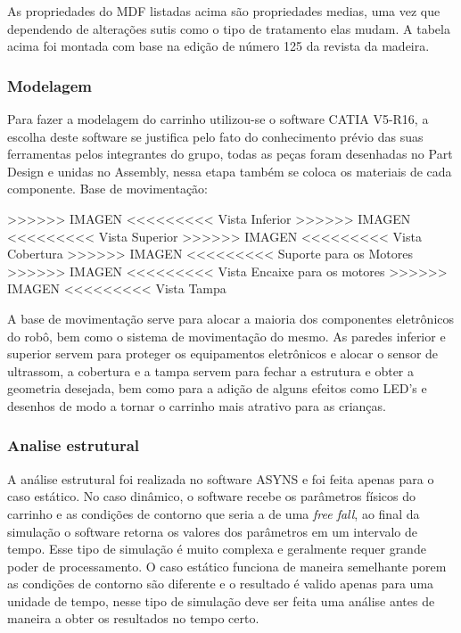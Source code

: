 As propriedades do MDF listadas acima são propriedades medias, uma vez que dependendo de alterações sutis como o tipo de
tratamento elas mudam. A tabela acima foi montada com base na edição de número 125 da revista da madeira.

\subsubsection{Modelagem}

Para fazer a modelagem do carrinho utilizou-se o software CATIA V5-R16, a escolha deste software se justifica pelo fato do
conhecimento prévio das suas ferramentas pelos integrantes do grupo, todas as peças foram desenhadas no Part Design e unidas
no Assembly, nessa etapa também se coloca os materiais de cada componente. Base de movimentação:

>>>>>> IMAGEN <<<<<<<<<
Vista Inferior
>>>>>> IMAGEN <<<<<<<<<
Vista Superior
>>>>>> IMAGEN <<<<<<<<<
Vista Cobertura
>>>>>> IMAGEN <<<<<<<<<
Suporte para os Motores
>>>>>> IMAGEN <<<<<<<<<
Vista Encaixe para os motores
>>>>>> IMAGEN <<<<<<<<<
Vista Tampa

A base de movimentação serve para alocar a maioria dos componentes eletrônicos do robô, bem como o sistema de movimentação do
mesmo. As paredes inferior e superior servem para proteger os equipamentos eletrônicos e alocar o sensor de ultrassom, a cobertura
e a tampa servem para fechar a estrutura e obter a geometria desejada, bem como para a adição de alguns efeitos como LED’s e desenhos
de modo a tornar o carrinho mais atrativo para as crianças.

\subsubsection{Analise estrutural}

A análise estrutural foi realizada no software ASYNS e foi feita apenas para o caso estático. No caso dinâmico, o software
recebe os parâmetros físicos do carrinho e as condições de contorno que seria a de uma \textit{free fall}, ao final da simulação o software
retorna os valores dos parâmetros em um intervalo de tempo. Esse tipo de simulação é muito complexa e geralmente requer grande poder
de processamento. O caso estático funciona de maneira semelhante porem as condições de contorno são diferente e o resultado é valido
apenas para uma unidade de tempo, nesse tipo de simulação deve ser feita uma análise antes de maneira a obter os resultados no tempo certo.

